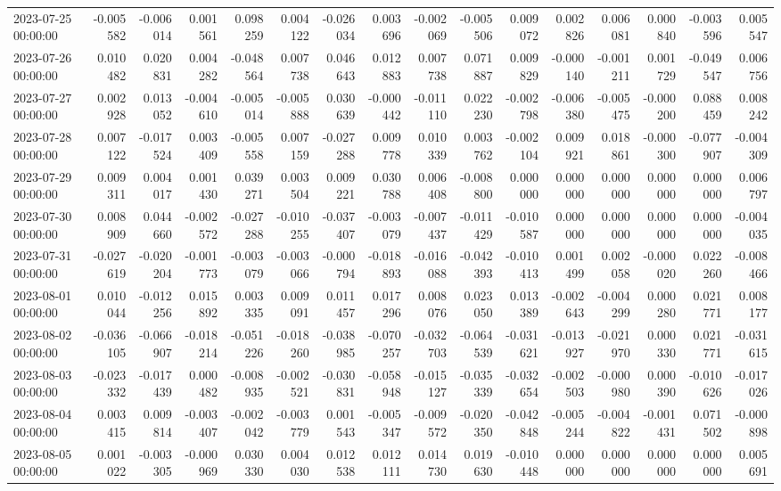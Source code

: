 \begin{tabular}{lrrrrrrrrrrrrrrr}
2023-07-25 00:00:00 & -0.005582 & -0.006014 & 0.001561 & 0.098259 & 0.004122 & -0.026034 & 0.003696 & -0.002069 & -0.005506 & 0.009072 & 0.002826 & 0.006081 & 0.000840 & -0.003596 & 0.005547 \\
2023-07-26 00:00:00 & 0.010482 & 0.020831 & 0.004282 & -0.048564 & 0.007738 & 0.046643 & 0.012883 & 0.007738 & 0.071887 & 0.009829 & -0.000140 & -0.001211 & 0.001729 & -0.049547 & 0.006756 \\
2023-07-27 00:00:00 & 0.002928 & 0.013052 & -0.004610 & -0.005014 & -0.005888 & 0.030639 & -0.000442 & -0.011110 & 0.022230 & -0.002798 & -0.006380 & -0.005475 & -0.000200 & 0.088459 & 0.008242 \\
2023-07-28 00:00:00 & 0.007122 & -0.017524 & 0.003409 & -0.005558 & 0.007159 & -0.027288 & 0.009778 & 0.010339 & 0.003762 & -0.002104 & 0.009921 & 0.018861 & -0.000300 & -0.077907 & -0.004309 \\
2023-07-29 00:00:00 & 0.009311 & 0.004017 & 0.001430 & 0.039271 & 0.003504 & 0.009221 & 0.030788 & 0.006408 & -0.008800 & 0.000000 & 0.000000 & 0.000000 & 0.000000 & 0.000000 & 0.006797 \\
2023-07-30 00:00:00 & 0.008909 & 0.044660 & -0.002572 & -0.027288 & -0.010255 & -0.037407 & -0.003079 & -0.007437 & -0.011429 & -0.010587 & 0.000000 & 0.000000 & 0.000000 & 0.000000 & -0.004035 \\
2023-07-31 00:00:00 & -0.027619 & -0.020204 & -0.001773 & -0.003079 & -0.003066 & -0.000794 & -0.018893 & -0.016088 & -0.042393 & -0.010413 & 0.001499 & 0.002058 & -0.000020 & 0.022260 & -0.008466 \\
2023-08-01 00:00:00 & 0.010044 & -0.012256 & 0.015892 & 0.003335 & 0.009091 & 0.011457 & 0.017296 & 0.008076 & 0.023050 & 0.013389 & -0.002643 & -0.004299 & 0.000280 & 0.021771 & 0.008177 \\
2023-08-02 00:00:00 & -0.036105 & -0.066907 & -0.018214 & -0.051226 & -0.018260 & -0.038985 & -0.070257 & -0.032703 & -0.064539 & -0.031621 & -0.013927 & -0.021970 & 0.000330 & 0.021771 & -0.031615 \\
2023-08-03 00:00:00 & -0.023332 & -0.017439 & 0.000482 & -0.008935 & -0.002521 & -0.030831 & -0.058948 & -0.015127 & -0.035339 & -0.032654 & -0.002503 & -0.000980 & 0.000390 & -0.010626 & -0.017026 \\
2023-08-04 00:00:00 & 0.003415 & 0.009814 & -0.003407 & -0.002042 & -0.003779 & 0.001543 & -0.005347 & -0.009572 & -0.020350 & -0.042848 & -0.005244 & -0.004822 & -0.001431 & 0.071502 & -0.000898 \\
2023-08-05 00:00:00 & 0.001022 & -0.003305 & -0.000969 & 0.030330 & 0.004030 & 0.012538 & 0.012111 & 0.014730 & 0.019630 & -0.010448 & 0.000000 & 0.000000 & 0.000000 & 0.000000 & 0.005691 \\

\end{tabular}
